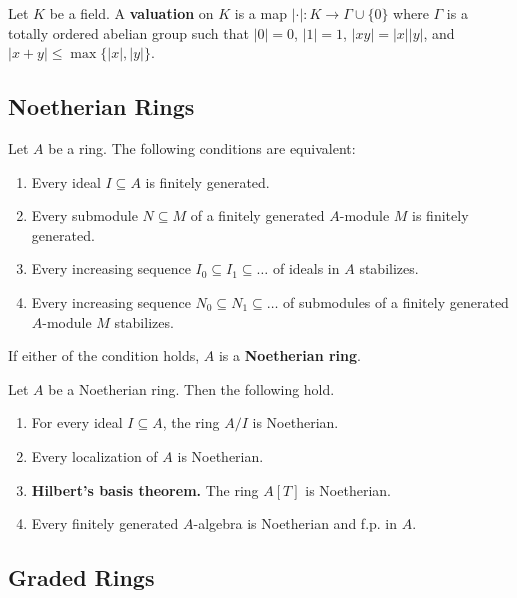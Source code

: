 \documentclass{template}
\begin{document}
\begin{definition}
    Let $K$ be a field. A \textbf{valuation} on $K$ is a map $|\cdot|: K \to
    \Gamma \cup \{0\}$ where $\Gamma$ is a totally ordered abelian group such
    that $|0|=0$, $|1|=1$, $|xy|=|x||y|$, and $|x+y| \leq \max\{|x|, |y|\}$.
\end{definition}

\subsection{Noetherian Rings}

\begin{definition}
    Let $A$ be a ring. The following conditions are equivalent:
    \begin{enumerate}
        \item[(i)] Every ideal $I \subseteq A$ is finitely generated.
        \item[(ii)] Every submodule $N \subseteq M$ of a finitely 
        generated $A$-module $M$ is finitely generated.
        \item[(iii)] Every increasing sequence $I_0 \subseteq I_1 \subseteq \dots$ of 
        ideals in $A$ stabilizes.
        \item[(iv)] Every increasing sequence $N_0 \subseteq N_1 \subseteq \dots$ of 
        submodules of a finitely generated $A$-module $M$ stabilizes. 
    \end{enumerate}
    If either of the condition holds, $A$ is a \textbf{Noetherian ring}.
\end{definition}

\begin{proposition}
    Let $A$ be a Noetherian ring. Then the following hold.
    \begin{enumerate}
        \item[(a)] For every ideal $I \subseteq A$, the ring $A/I$ is Noetherian.
        \item[(b)] Every localization of $A$ is Noetherian.
        \item[(c)] \textbf{Hilbert's basis theorem.} The ring $A[T]$ is Noetherian.
        \item[(d)] Every finitely generated $A$-algebra is Noetherian and f.p. in $A$.   
    \end{enumerate}
\end{proposition}

\subsection{Graded Rings}
\end{document}
